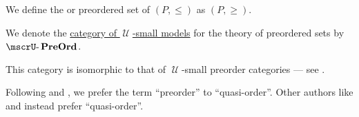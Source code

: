 \begin{definition}
\begin{thmenum}[resume=def:preordered_set]
     We define the  or  preordered set of \( (P, \leq) \) as \( (P, \geq) \).

      We denote the \hyperref[def:category_of_small_first_order_models]{category of \( \mscrU \)-small models} for the theory of preordered sets by \( \ucat{PreOrd} \).

    This category is isomorphic to that of \( \mscrU \)-small preorder categories --- see .
  \end{thmenum}
\end{definition}
\begin{comments}
  \item Following  and , we prefer the term \enquote{preorder} to \enquote{quasi-order}. Other authors like  and  instead prefer \enquote{quasi-order}.
\end{comments}

